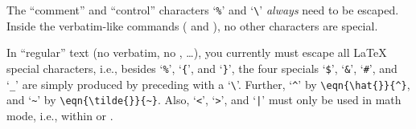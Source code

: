 The ``comment'' and ``control'' characters `\texttt{\%}' and `\verb+\+'
\emph{always} need to be escaped.  Inside the verbatim-like commands
( and ), no other characters are special.

In ``regular'' text (no verbatim, no , \ldots), you currently
must escape all \LaTeX{} special characters, i.e., besides
`\texttt{\%}', `\verb+{+', and `\verb+}+', the four specials
`\texttt{\$}', `\texttt{\&}', `\texttt{\#}', and `\texttt{\_}' are
simply produced by preceding with a `\verb+\+'.  Further, `\verb+^+' by
\verb|\eqn{\hat{}}{^}|, and `\verb|~|' by \verb|\eqn{\tilde{}}{~}|.
Also, `\verb|<|', `\verb|>|', and `\verb+|+' must only be used in math
mode, i.e., within  or .

